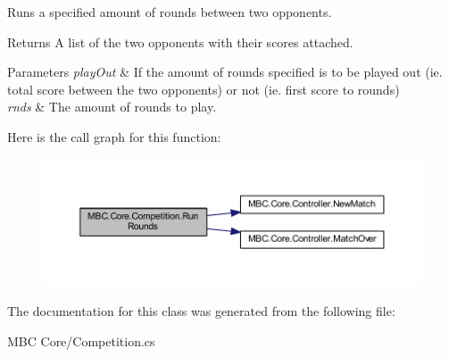 Runs a specified amount of rounds between two opponents.

\begin{DoxyReturn}{Returns}
A list of the two opponents with their scores attached.
\end{DoxyReturn}

\begin{DoxyParams}{Parameters}
{\em play\-Out} & If the amount of rounds specified is to be played out (ie. total score between the two opponents) or not (ie. first score to rounds)\\
\hline
{\em rnds} & The amount of rounds to play.\\
\hline
\end{DoxyParams}


Here is the call graph for this function\-:\nopagebreak
\begin{figure}[H]
\begin{center}
\leavevmode
\includegraphics[width=350pt]{class_m_b_c_1_1_core_1_1_competition_ae6f1520c4f77bef9f8b9760b40517857_cgraph}
\end{center}
\end{figure}




The documentation for this class was generated from the following file\-:\begin{DoxyCompactItemize}
\item 
M\-B\-C Core/Competition.\-cs\end{DoxyCompactItemize}
